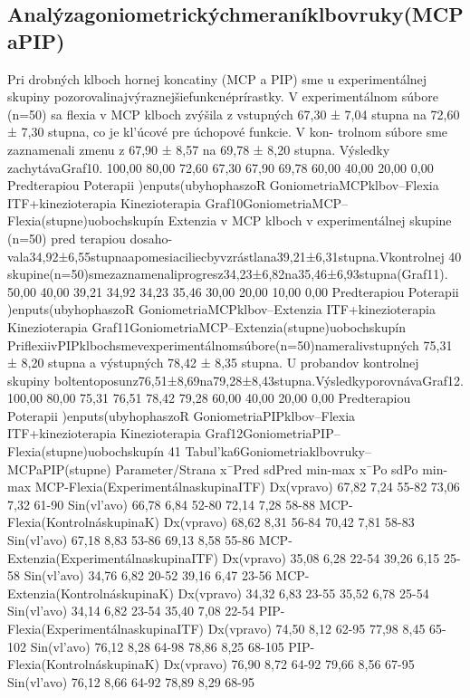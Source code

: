 \subsection{Analýzagoniometrickýchmeraníklbovruky(MCPaPIP)}

Pri drobných klboch hornej koncatiny (MCP a PIP) sme u experimentálnej skupiny pozorovalinajvýraznejšiefunkcnéprírastky. V experimentálnom súbore (n=50) sa flexia v MCP klboch zvýšila z vstupných 67,30 ± 7,04 stupna na 72,60 ± 7,30 stupna, co je kl’úcové pre úchopové funkcie. V kon- trolnom súbore sme zaznamenali zmenu z 67,90 ± 8,57 na 69,78 ± 8,20 stupna. Výsledky zachytávaGraf10. 100,00 80,00 72,60 67,30 67,90 69,78 60,00 40,00 20,00 0,00 Predterapiou Poterapii )enputs(ubyhophaszoR GoniometriaMCPklbov--Flexia ITF+kinezioterapia Kinezioterapia Graf10GoniometriaMCP--Flexia(stupne)uobochskupín Extenzia v MCP klboch v experimentálnej skupine (n=50) pred terapiou dosaho- vala34,92±6,55stupnaapomesiaciliecbyvzrástlana39,21±6,31stupna.Vkontrolnej 40 skupine(n=50)smezaznamenaliprogresz34,23±6,82na35,46±6,93stupna(Graf11). 50,00 40,00 39,21 34,92 34,23 35,46 30,00 20,00 10,00 0,00 Predterapiou Poterapii )enputs(ubyhophaszoR GoniometriaMCPklbov--Extenzia ITF+kinezioterapia Kinezioterapia Graf11GoniometriaMCP--Extenzia(stupne)uobochskupín PriflexiivPIPklbochsmevexperimentálnomsúbore(n=50)nameralivstupných 75,31 ± 8,20 stupna a výstupných 78,42 ± 8,35 stupna. U probandov kontrolnej skupiny boltentoposunz76,51±8,69na79,28±8,43stupna.VýsledkyporovnávaGraf12. 100,00 80,00 75,31 76,51 78,42 79,28 60,00 40,00 20,00 0,00 Predterapiou Poterapii )enputs(ubyhophaszoR GoniometriaPIPklbov--Flexia ITF+kinezioterapia Kinezioterapia Graf12GoniometriaPIP--Flexia(stupne)uobochskupín 41 Tabul’ka6Goniometriaklbovruky--MCPaPIP(stupne) Parameter/Strana x¯Pred sdPred min-max x¯Po sdPo min-max MCP-Flexia(ExperimentálnaskupinaITF) Dx(vpravo) 67,82 7,24 55-82 73,06 7,32 61-90 Sin(vl’avo) 66,78 6,84 52-80 72,14 7,28 58-88 MCP-Flexia(KontrolnáskupinaK) Dx(vpravo) 68,62 8,31 56-84 70,42 7,81 58-83 Sin(vl’avo) 67,18 8,83 53-86 69,13 8,58 55-86 MCP-Extenzia(ExperimentálnaskupinaITF) Dx(vpravo) 35,08 6,28 22-54 39,26 6,15 25-58 Sin(vl’avo) 34,76 6,82 20-52 39,16 6,47 23-56 MCP-Extenzia(KontrolnáskupinaK) Dx(vpravo) 34,32 6,83 23-55 35,52 6,78 25-54 Sin(vl’avo) 34,14 6,82 23-54 35,40 7,08 22-54 PIP-Flexia(ExperimentálnaskupinaITF) Dx(vpravo) 74,50 8,12 62-95 77,98 8,45 65-102 Sin(vl’avo) 76,12 8,28 64-98 78,86 8,25 68-105 PIP-Flexia(KontrolnáskupinaK) Dx(vpravo) 76,90 8,72 64-92 79,66 8,56 67-95 Sin(vl’avo) 76,12 8,66 64-92 78,89 8,29 68-95


